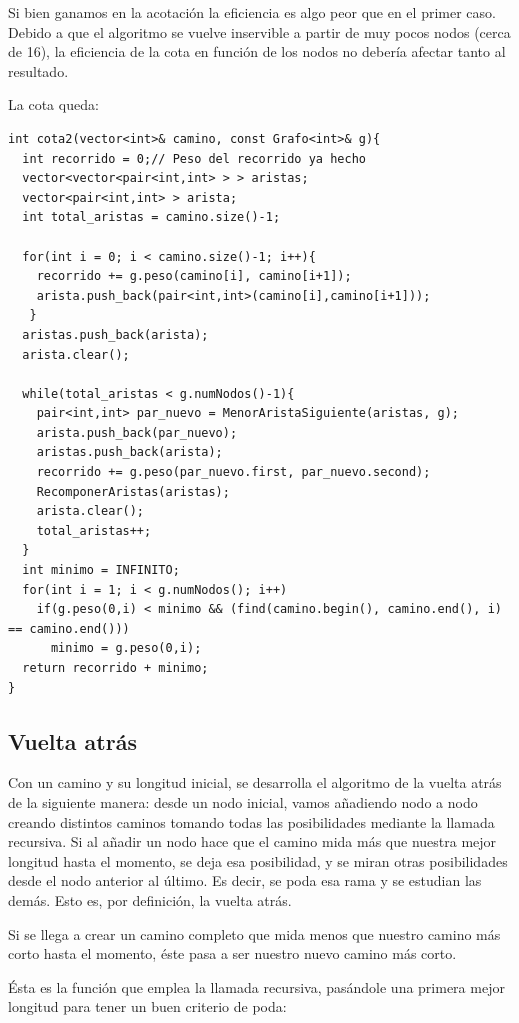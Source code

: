 Si bien ganamos en la acotación %
la eficiencia es algo peor que en el primer caso. Debido a que el algoritmo se vuelve inservible a partir de muy pocos nodos (cerca de 16), la eficiencia de la cota en función de los nodos no debería afectar tanto al resultado. %

La cota queda:
\begin{lstlisting}
int cota2(vector<int>& camino, const Grafo<int>& g){
  int recorrido = 0;// Peso del recorrido ya hecho
  vector<vector<pair<int,int> > > aristas;
  vector<pair<int,int> > arista;
  int total_aristas = camino.size()-1;

  for(int i = 0; i < camino.size()-1; i++){
    recorrido += g.peso(camino[i], camino[i+1]);
    arista.push_back(pair<int,int>(camino[i],camino[i+1]));
   }
  aristas.push_back(arista);
  arista.clear();

  while(total_aristas < g.numNodos()-1){
    pair<int,int> par_nuevo = MenorAristaSiguiente(aristas, g);
    arista.push_back(par_nuevo);
    aristas.push_back(arista);
    recorrido += g.peso(par_nuevo.first, par_nuevo.second);
    RecomponerAristas(aristas);
    arista.clear();
    total_aristas++;
  }
  int minimo = INFINITO;
  for(int i = 1; i < g.numNodos(); i++)
    if(g.peso(0,i) < minimo && (find(camino.begin(), camino.end(), i) == camino.end()))
      minimo = g.peso(0,i);
  return recorrido + minimo;
}
\end{lstlisting}

\subsection{Vuelta atrás}

Con un camino y su longitud inicial, se desarrolla el algoritmo de la vuelta atrás de la siguiente manera: desde un nodo inicial, vamos añadiendo nodo a nodo creando distintos caminos tomando todas las posibilidades mediante la llamada recursiva. Si al añadir un nodo hace que el camino mida más que nuestra mejor longitud hasta el momento, se deja esa posibilidad, y se miran otras posibilidades desde el nodo anterior al último. Es decir, se poda esa rama y se estudian las demás. Esto es, por definición, la vuelta atrás.

Si se llega a crear un camino completo que mida menos que nuestro camino más corto hasta el momento, éste pasa a ser nuestro nuevo camino más corto.

Ésta es la función que emplea la llamada recursiva, pasándole una primera mejor longitud para tener un buen criterio de poda:

